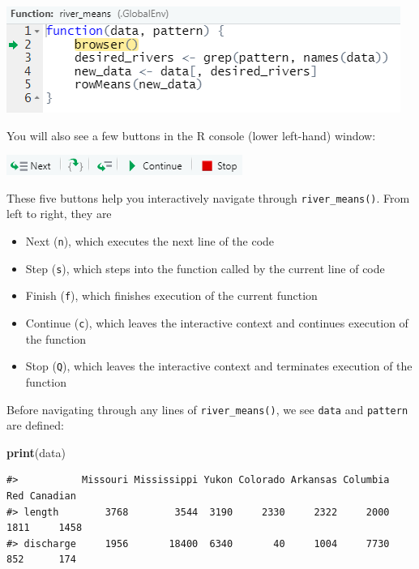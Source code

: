 \documentclass[
]{book}
\newenvironment{Shaded}{\begin{snugshade}}{\end{snugshade}}
\newcommand{\KeywordTok}[1]{\textcolor[rgb]{0.13,0.29,0.53}{\textbf{#1}}}
\newcommand{\NormalTok}[1]{#1}
\providecommand{\tightlist}{%
  \setlength{\itemsep}{0pt}\setlength{\parskip}{0pt}}
\begin{document}
\includegraphics[width=0.75\linewidth]{images/newrpack_files7}

You will also see a few buttons in the R console (lower left-hand) window:

\includegraphics[width=0.75\linewidth]{images/newrpack_files8}

These five buttons help you interactively navigate through \texttt{river\_means()}. From left to right, they are

\begin{itemize}
\tightlist
\item
  Next (\texttt{n}), which executes the next line of the code
\item
  Step (\texttt{s}), which steps into the function called by the current line of code
\item
  Finish (\texttt{f}), which finishes execution of the current function
\item
  Continue (\texttt{c}), which leaves the interactive context and continues execution of the function
\item
  Stop (\texttt{Q}), which leaves the interactive context and terminates execution of the function
\end{itemize}

Before navigating through any lines of \texttt{river\_means()}, we see \texttt{data} and \texttt{pattern} are defined:

\begin{Shaded}
\begin{Highlighting}[]
\KeywordTok{print}\NormalTok{(data)}
\end{Highlighting}
\end{Shaded}

\begin{verbatim}
#>           Missouri Mississippi Yukon Colorado Arkansas Columbia  Red Canadian
#> length        3768        3544  3190     2330     2322     2000 1811     1458
#> discharge     1956       18400  6340       40     1004     7730  852      174
\end{verbatim}
\end{document}
